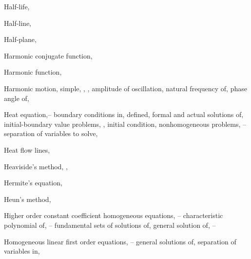 \begin{theindex}
  \item Half-life, \pageref{eq:4.1.3}

  \item Half-line, \pageref{eq:10.4.19}

  \item Half-plane, \pageref{figure:10.5.1}

  \item Harmonic conjugate function, \pageref{exer:2.5.43}

  \item Harmonic function, \pageref{exer:2.5.43}

  \item Harmonic motion, simple, \pageref{eq:4.4.12}, \pageref{eq:6.1.10} \pageref{example:6.3.1}, \pageref{eq:6.3.10}
    \subitem amplitude of oscillation, \pageref{example:6.1.2}
    \subitem natural frequency of, \pageref{example:6.1.2}
    \subitem phase angle of, \pageref{example:6.1.2}

  \item Heat equation,\pageref{eq:12.1.1}--\pageref{exer:12.1.54}
    \subitem boundary conditions in, \pageref{eq:12.1.1}
    \subitem defined, \pageref{eq:12.1.1}
    \subitem formal and actual solutions of, \pageref{thmtype:12.1.1}
    \subitem initial-boundary value problems, \pageref{eq:12.1.1}, \pageref{eq:12.1.13}
    \subitem initial condition, \pageref{eq:12.1.1}
    \subitem nonhomogeneous problems, \pageref{eq:12.1.9}--\pageref{eq:12.1.12}
    \subitem separation of variables to solve, \pageref{eq:12.1.1}

  \item Heat flow lines, \pageref{eq:4.5.16}

  \item Heaviside's method, \pageref{thmtype:8.2.2}, \pageref{exer:8.2.3}

  \item Hermite's equation, \pageref{eq:7.2.16}

  \item Heun's method, \pageref{exer:3.2.1}

  \item Higher order constant coefficient homogeneous equations, \pageref{eq:9.2.1}--\pageref{exer:9.2.45}
    \subitem characteristic polynomial of, \pageref{exer:9.2.1}--\pageref{eq:9.2.9}
    \subitem fundamental sets of solutions of, \pageref{thmtype:9.2.1}
    \subitem general solution of, \pageref{eq:9.2.3}--\pageref{exer:9.2.1}

  \item Homogeneous linear first order equations, \pageref{example:2.1.1}--\pageref{eq:2.1.15}
    \subitem general solutions of, \pageref{thmtype:2.1.1}
    \subitem separation of variables in, \pageref{eq:2.1.16}


\end{theindex}

